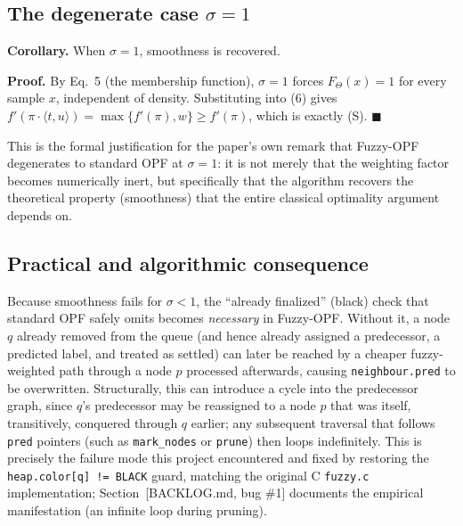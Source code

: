\subsection{The degenerate case $\sigma = 1$}

\textbf{Corollary.} When $\sigma = 1$, smoothness is recovered.

\textbf{Proof.} By Eq.~5 (the membership function), $\sigma = 1$ forces $F_\Theta(x) = 1$ for every sample $x$, independent of density. Substituting into (6) gives $f'(\pi \cdot \langle t,u\rangle) = \max\{f'(\pi), w\} \ge f'(\pi)$, which is exactly (S). $\blacksquare$

This is the formal justification for the paper's own remark that Fuzzy-OPF degenerates to standard OPF at $\sigma = 1$: it is not merely that the weighting factor becomes numerically inert, but specifically that the algorithm recovers the theoretical property (smoothness) that the entire classical optimality argument depends on.

\subsection{Practical and algorithmic consequence}

Because smoothness fails for $\sigma < 1$, the ``already finalized'' (black) check that standard OPF safely omits becomes \emph{necessary} in Fuzzy-OPF. Without it, a node $q$ already removed from the queue (and hence already assigned a predecessor, a predicted label, and treated as settled) can later be reached by a cheaper fuzzy-weighted path through a node $p$ processed afterwards, causing \texttt{neighbour.pred} to be overwritten. Structurally, this can introduce a cycle into the predecessor graph, since $q$'s predecessor may be reassigned to a node $p$ that was itself, transitively, conquered through $q$ earlier; any subsequent traversal that follows \texttt{pred} pointers (such as \texttt{mark\_nodes} or \texttt{prune}) then loops indefinitely. This is precisely the failure mode this project encountered and fixed by restoring the \texttt{heap.color[q] != BLACK} guard, matching the original C \texttt{fuzzy.c} implementation; Section~[BACKLOG.md, bug \#1] documents the empirical manifestation (an infinite loop during pruning).

